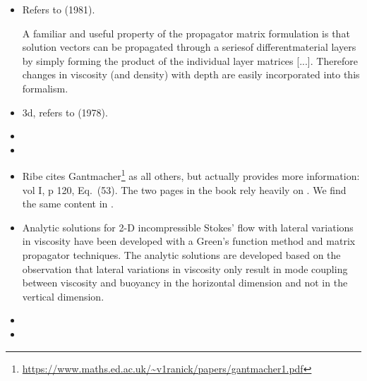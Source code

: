 \begin{itemize}
\item {}

Refers to \textcite{haoc81} (1981). 

\begin{displayquote}
{\color{darkgray}
A familiar and useful property of the propagator matrix
formulation is that solution vectors can be propagated
through a seriesof differentmaterial layers by simply forming
the product of the individual layer matrices [...].
Therefore changes in viscosity (and density) with depth are
easily incorporated into this formalism.
}
\end{displayquote}


\item {}

3d, refers to \textcite{haoc78} (1978).

\item {}

\item {}

\item {}

Ribe cites Gantmacher\footnote{\url{https://www.maths.ed.ac.uk/~v1ranick/papers/gantmacher1.pdf}} 
as all others, but actually provides 
more information: vol I, p 120, Eq.~(53).
The two pages in the book rely heavily on \cite{haoc81}.
We find the same content in \cite{ribe07}. 

\item {}

\begin{displayquote}
{\color{darkgray}
Analytic solutions for 2-D incompressible Stokes' flow with lateral variations in
viscosity have been developed with a Green’s function method and matrix propagator
techniques. The analytic solutions are developed based on the observation that lateral
variations in viscosity only result in mode coupling between viscosity and buoyancy in
the horizontal dimension and not in the vertical dimension.
}
\end{displayquote}

\item {}

\item {}


\end{itemize}
